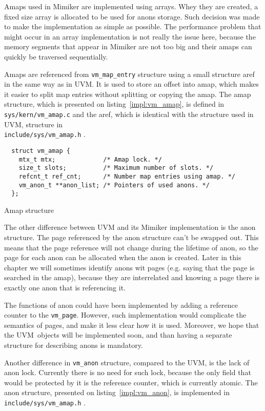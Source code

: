 Amaps used in Mimiker are implemented using arrays.
Whey they are created, a fixed size array is allocated to be used for anons storage.
Such decision was made to make the implementation as simple as possible.
The performance problem that might occur in an array implementation is not really the issue here,
because the memory segments that appear in Mimiker are not too big and their amaps can quickly be traversed sequentially.

Amaps are referenced from \texttt{vm_map_entry} structure using a small structure aref in the same way as in UVM.
It is used to store an offset into amap, which makes it easier to split map entries without splitting or copying the amap.
The amap structure, which is presented on listing~\ref{impl:vm_amap}, is defined in \texttt{sys/kern/vm_amap.c} and the aref,
which is identical with the structure used in UVM, structure in \\ \texttt{include/sys/vm_amap.h} \cite{mimiker:sources}.

\begin{listing}[h]
  \begin{verbatim}
  struct vm_amap {
    mtx_t mtx;             /* Amap lock. */
    size_t slots;          /* Maximum number of slots. */
    refcnt_t ref_cnt;      /* Number map entries using amap. */
    vm_anon_t **anon_list; /* Pointers of used anons. */
  };
  \end{verbatim}
  \caption{Amap structure}
  \label{impl:vm_amap}
\end{listing}

The other difference between UVM and its Mimiker implementation is the anon structure.
The page referenced by the anon structure can't be swapped out.
This means that the page reference will not change during the lifetime of anon, so the page for each anon can be allocated when the anon is created.
Later in this chapter we will sometimes identify anons wit pages (e.g. saying that the page is searched in the amap), because they are interrelated
and knowing a page there is exactly one anon that is referencing it.

The functions of anon could have been implemented by adding a reference counter to the \texttt{vm_page}.
However, such implementation would complicate the semantics of pages, and make it less clear how it is used.
Moreover, we hope that the UVM~objects will be implemented soon, and than having a separate structure for describing anons is mandatory.

Another difference in \texttt{vm_anon} structure, compared to the UVM, is the lack of anon lock.
Currently there is no need for such lock, because the only field that would be protected by it is the reference counter, which is currently atomic.
The anon structure, presented on listing~\ref{impl:vm_anon}, is implemented in \texttt{include/sys/vm_amap.h} \cite{mimiker:sources}.

